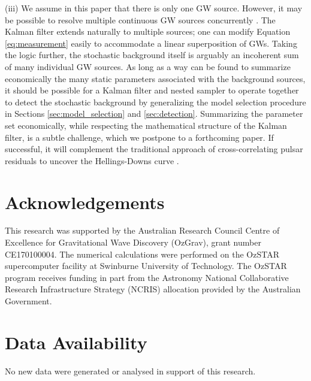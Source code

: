\documentclass[fleqn,usenatbib,useAMS]{mnras}
\begin{document}
(iii) We assume in this paper that there is only one GW source. However, it may be possible to resolve multiple continuous GW sources concurrently \citep{PhysRevD.85.044034}. The Kalman filter extends naturally to multiple sources; one can modify Equation \eqref{eq:measurement} easily to accommodate a linear superposition of GWs. Taking the logic further, the stochastic background itself is arguably an incoherent sum of many individual GW sources. As long as a way can be found to summarize economically the many static parameters associated with the background sources, it should be possible for a Kalman filter and nested sampler to operate together to detect the stochastic background by generalizing the model selection procedure in Sections \ref{sec:model_selection} and \ref{sec:detection}. Summarizing the parameter set economically, while respecting the mathematical structure of the Kalman filter, is a subtle challenge, which we postpone to a forthcoming paper. If successful, it will complement the traditional approach of cross-correlating pulsar residuals to uncover the Hellings-Downs curve \citep{Hellings,2023ApJ...951L...8A}. \newline 




\section*{Acknowledgements}
This research was supported by the Australian Research Council Centre of Excellence for Gravitational Wave Discovery (OzGrav), grant number CE170100004. The numerical calculations were performed on the OzSTAR supercomputer facility at Swinburne University of Technology. The OzSTAR program receives funding in part from the Astronomy National Collaborative Research Infrastructure Strategy (NCRIS) allocation provided by the Australian Government.


\section*{Data Availability}
No new data were generated or analysed in support of this research.






\appendix
\newpage
\newpage
\clearpage
\end{document}
